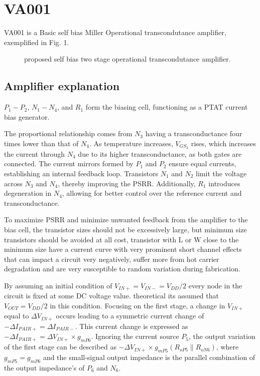 \documentclass[12pt]{article}
\begin{document}
\section{VA001}
VA001 is a Basic self bias Miller Operational transcondutance amplifier, exemplified in Fig. 1.


\begin{figure}[H]
        \centering
        
        \caption{proposed self bias two stage operational transcondutance amplifier.}
        \label{OP}
\end{figure}
\subsection{Amplifier explanation}
$P_1 - P_2$, $N_1 - N_4$, and $R_1$ form the biasing cell, functioning as a PTAT current bias generator.  

The proportional relationship comes from $N_3$ having a transconductance four times lower than that of $N_4$. As temperature increases, $V_{GS_3}$ rises, which increases the current through $N_4$ due to its higher transconductance, as both gates are connected. The current mirrors formed by $P_1$ and $P_2$ ensure equal currents, establishing an internal feedback loop. Transistors $N_1$ and $N_2$ limit the voltage across $N_3$ and $N_4$, thereby improving the PSRR. Additionally, $R_1$ introduces degeneration in $N_4$, allowing for better control over the reference current and transconductance.

To maximize PSRR and minimize unwanted feedback from the amplifier to the bias cell, the transistor sizes should not be excessively large, but minimum size transistors should be avoided at all cost, transistor with L or W close to the minimum size have a current curve with very prominent short channel effects that can impact a circuit very negatively, suffer more from hot carrier degradation and are very susceptible to random variation during fabrication. 





By assuming an initial condition of $V_{IN+} = V_{IN-} = V_{DD}/2$ every node in the circuit is fixed at some DC voltage value.  theoretical its assumed that $V_{OUT}=V_{DD}/2$ in this condition.
Focusing on the first stage, a change in $V_{IN+}$ equal to $\Delta V_{IN+}$ occurs leading to a symmetric current change of $-\Delta I_{PAIR+} = \Delta I_{PAIR-}$. This current change is expressed as $-\Delta I_{PAIR+} = \Delta V_{IN+} \times g_{mP6}$. Ignoring the current source $P_5$, the output variation of the first stage can be described as $-\Delta V_{IN+} \times g_{mP5} (R_{oP5} \parallel R_{oN6})$, where $g_{mP5} = g_{mP6}$ and the small-signal output impedance is the parallel combination of the output impedance's of $P_6$ and $N_6$.
\end{document}

